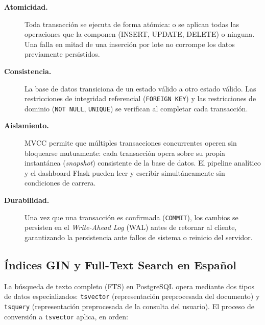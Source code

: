 \begin{description}
    \item[\textbf{Atomicidad.}] Toda transacción se ejecuta de forma atómica:
          o se aplican todas las operaciones que la componen (INSERT, UPDATE, DELETE)
          o ninguna. Una falla en mitad de una inserción por lote no corrompe los
          datos previamente persistidos.

    \item[\textbf{Consistencia.}] La base de datos transiciona de un estado
          válido a otro estado válido. Las restricciones de integridad referencial
          (\texttt{FOREIGN KEY}) y las restricciones de dominio (\texttt{NOT NULL},
          \texttt{UNIQUE}) se verifican al completar cada transacción.

    \item[\textbf{Aislamiento.}] MVCC permite que múltiples transacciones concurrentes
          operen sin bloquearse mutuamente: cada transacción opera sobre su propia
          instantánea (\textit{snapshot}) consistente de la base de datos. El
          pipeline analítico y el dashboard Flask pueden leer y escribir
          simultáneamente sin condiciones de carrera.

    \item[\textbf{Durabilidad.}] Una vez que una transacción es confirmada
          (\texttt{COMMIT}), los cambios se persisten en el \textit{Write-Ahead Log}
          (WAL) antes de retornar al cliente, garantizando la persistencia ante
          fallos de sistema o reinicio del servidor.
\end{description}

\subsection{Índices GIN y Full-Text Search en Español}
\label{subsec:mt_fts}

La búsqueda de texto completo (FTS) en PostgreSQL opera mediante dos tipos de datos
especializados: \texttt{tsvector} (representación preprocesada del documento) y
\texttt{tsquery} (representación preprocesada de la consulta del usuario). El proceso
de conversión a \texttt{tsvector} aplica, en orden:

